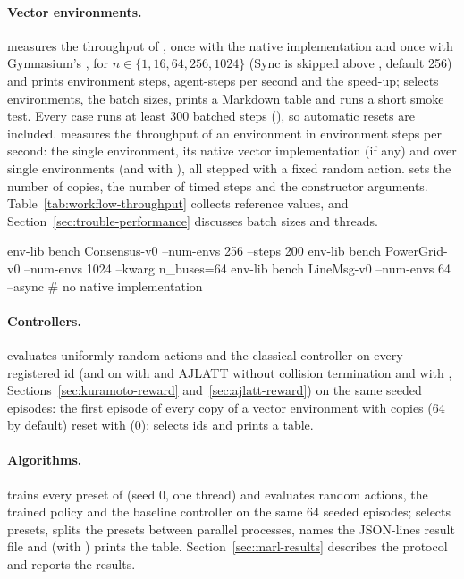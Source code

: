 \paragraph{Vector environments.}  measures
the throughput of , once with the native
implementation and once with Gymnasium's , for
$n \in \{1, 16, 64, 256, 1024\}$
(Sync is skipped above , default 256) and prints environment
steps, agent-steps per second and the speed-up;  selects
environments,  the batch sizes,  prints a
Markdown table and  runs a short smoke test. Every case runs at
least 300 batched steps (), so automatic resets are
included.  measures the throughput
of an environment in environment steps per second: the single environment, its
native vector implementation (if any) and  over single
environments (and  with ), all stepped
with a fixed random action.  sets the number of copies,
 the number of timed steps and  the
constructor arguments. Table~\ref{tab:workflow-throughput} collects reference
values, and Section~\ref{sec:trouble-performance} discusses batch sizes and
threads.

\begin{shellcode}
env-lib bench Consensus-v0 --num-envs 256 --steps 200
env-lib bench PowerGrid-v0 --num-envs 1024 --kwarg n_buses=64
env-lib bench LineMsg-v0 --num-envs 64 --async     # no native implementation
\end{shellcode}

\paragraph{Controllers.}  evaluates
uniformly random actions and the classical controller on every registered id
(and on  with  and
AJLATT without collision termination and with ,
Sections~\ref{sec:kuramoto-reward} and~\ref{sec:ajlatt-reward}) on the same
seeded episodes: the
first episode of every copy of a vector environment with 
copies (64 by default) reset with  (0);  selects
ids and  prints a table.

\paragraph{Algorithms.}  trains every
preset of  (seed 0, one thread) and evaluates random
actions, the trained policy and the baseline controller on the same 64 seeded
episodes;  selects presets,  splits the
presets between parallel processes,  names the JSON-lines result
file and  (with ) prints the table.
Section~\ref{sec:marl-results} describes the protocol and reports the results.

